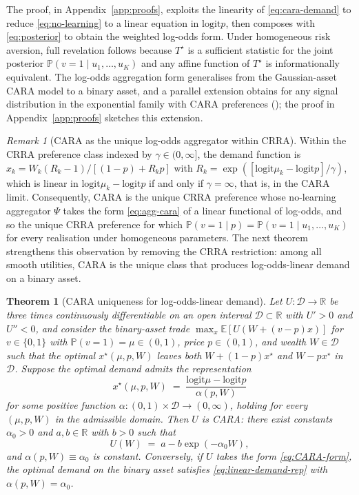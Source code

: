 \documentclass[12pt,letterpaper]{article}
\newtheorem{theorem}{Theorem}
\theoremstyle{definition}
\theoremstyle{remark}
\newtheorem{remark}{Remark}
\newcommand{\R}{\mathbb{R}}
\newcommand{\E}{\mathbb{E}}
\newcommand{\PP}{\mathbb{P}}
\newcommand{\logit}{\mathrm{logit}}
\newcommand{\Tstar}{T^{\!\star}}
\newcommand{\1}{\mathbf{1}}
\begin{document}
The proof, in Appendix~\ref{app:proofs}, exploits the linearity of
\eqref{eq:cara-demand} to reduce \eqref{eq:no-learning} to a linear equation
in $\logit p$, then composes with \eqref{eq:posterior} to obtain the
weighted log-odds form. Under homogeneous risk aversion, full revelation
follows because $\Tstar$ is a sufficient statistic for the joint posterior
$\PP(v=1\mid u_{1},\ldots,u_{K})$ and any affine function of $\Tstar$ is
informationally equivalent. The log-odds aggregation form generalises
\citet{DeMarzoSkiadas1998} from the Gaussian-asset CARA model to a binary
asset, and a parallel extension obtains for any signal distribution in the
exponential family with CARA preferences (\citealp{BreonDrish2015}); the
proof in Appendix~\ref{app:proofs} sketches this extension.

\begin{remark}[CARA as the unique log-odds aggregator within CRRA]\label{rem:unique-cara}
Within the CRRA preference class indexed by $\gamma\in(0,\infty]$, the
demand function is $x_{k}=W_{k}(R_{k}-1)/[(1-p)+R_{k}p]$ with
$R_{k}=\exp([\logit\mu_{k}-\logit p]/\gamma)$, which is linear in
$\logit\mu_{k}-\logit p$ if and only if $\gamma=\infty$, that is, in the
CARA limit. Consequently, CARA is the unique CRRA preference whose
no-learning aggregator $\Psi$ takes the form \eqref{eq:agg-cara} of a
linear functional of log-odds, and so the unique CRRA preference for which
\(\PP(v=1\mid p)=\PP(v=1\mid u_{1},\ldots,u_{K})\) for every realisation
under homogeneous parameters. The next theorem strengthens this
observation by removing the CRRA restriction: among all smooth utilities,
CARA is the unique class that produces log-odds-linear demand on a
binary asset.
\end{remark}

\begin{theorem}[CARA uniqueness for log-odds-linear demand]\label{thm:cara-unique}
Let $U:\mathcal{D}\to\R$ be three times continuously differentiable on an
open interval $\mathcal{D}\subset\R$ with $U'>0$ and $U''<0$, and consider
the binary-asset trade $\max_{x}\E[U(W+(v-p)x)]$ for $v\in\{0,1\}$ with
$\PP(v=1)=\mu\in(0,1)$, price $p\in(0,1)$, and wealth $W\in\mathcal{D}$
such that the optimal $x^{\star}(\mu,p,W)$ leaves both $W+(1-p)x^{\star}$
and $W-px^{\star}$ in $\mathcal{D}$. Suppose the optimal demand admits the
representation
\begin{equation}
   x^{\star}(\mu,p,W) \;=\; \frac{\logit\mu-\logit p}{\alpha(p,W)}
\label{eq:linear-demand-rep}
\end{equation}
for some positive function $\alpha:(0,1)\times\mathcal{D}\to(0,\infty)$,
holding for every $(\mu,p,W)$ in the admissible domain. Then $U$ is CARA:
there exist constants $\alpha_{0}>0$ and $a,b\in\R$ with $b>0$ such that
\begin{equation}
   U(W) \;=\; a - b\exp(-\alpha_{0}W),
\label{eq:CARA-form}
\end{equation}
and $\alpha(p,W)\equiv\alpha_{0}$ is constant. Conversely, if $U$ takes
the form \eqref{eq:CARA-form}, the optimal demand on the binary asset
satisfies \eqref{eq:linear-demand-rep} with $\alpha(p,W)=\alpha_{0}$.
\end{theorem}
\end{document}
